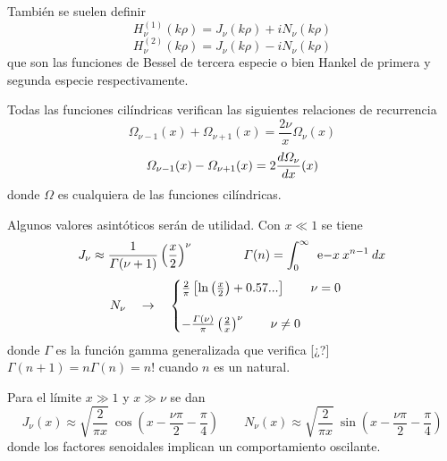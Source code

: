 \documentclass[10pt,oneside]{CBFT_book}
\begin{document}
También se suelen definir
\[
	H^{(1)}_\nu(k\rho) = J_\nu(k\rho) + i N_\nu(k\rho)
\]
\[
	H^{(2)}_\nu(k\rho) = J_\nu(k\rho) - i N_\nu(k\rho)
\]
que son las funciones de Bessel de tercera especie o bien Hankel de primera y segunda especie respectivamente.

Todas las funciones cilíndricas verifican las siguientes relaciones de recurrencia
\[
	\Omega_{\nu-1}(x) + \Omega_{\nu+1}(x) = \frac{2\nu}{x} \Omega_{\nu}(x)
\]
\[
	\Omega_{\nu-1}(x) - \Omega_{\nu+1}(x) = 2 \frac{d^{\hspace{-0.05em}} { \Omega_{\nu} }}{d { x }^{\hspace{-0.05em}}}(x)
\]
donde $\Omega$ es cualquiera de las funciones cilíndricas.

Algunos valores asintóticos serán de utilidad. Con $ x \ll 1$ se tiene
\[
	J_\nu \approx \frac{1}{\Gamma(\nu+1)} \left( \frac{ x }{ 2 } \right)^\nu \qquad \qquad 
	\Gamma(n) = \int_0^\infty \: \:\mathrm{e}{-x} \: x^{n-1} \: dx
\]
\[
	N_\nu \quad \to \quad \begin{cases}
			\frac{2}{\pi}\left[ \ln\left( \frac{ x }{ 2 } \right) + 0.57... \right]  \qquad \nu=0 \\
			\\
			- \frac{\Gamma(\nu)}{\pi}\left( \frac{ 2 }{ x } \right)^\nu  \qquad \nu\neq 0
	             \end{cases}
\]
donde $\Gamma$ es la función gamma generalizada que verifica [¿?]
$\Gamma(n+1) = n \Gamma(n) = n!$ cuando $n$ es un natural.

Para el límite $ x \gg 1 $ y $ x \gg \nu$ se dan
\[
	J_\nu(x) \approx \sqrt{ \frac{2}{\pi x} } \: \cos\left( x - \frac{\nu \pi}{2} - \frac{\pi}{4} \right) \qquad 
	N_\nu(x) \approx \sqrt{ \frac{2}{\pi x} } \: \sin\left( x - \frac{\nu \pi}{2} - \frac{\pi}{4} \right)
\]
donde los factores senoidales implican un comportamiento oscilante.
\end{document}
